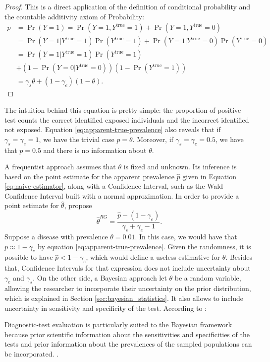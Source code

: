 \begin{proof}
  This is a direct application of the definition of conditional probability
  and the countable additivity axiom of Probability:
  \begin{equation*}
    \begin{split}
      p &= \Pr(Y = 1) = \Pr(Y = 1, Y^{\mathrm{true}} = 1) + \Pr(Y = 1, Y^{\mathrm{true}} = 0) \\
      &= \Pr(Y=1|Y^{\mathrm{true}}=1)\Pr(Y^{\mathrm{true}}=1) + \Pr(Y=1|Y^{\mathrm{true}}=0)\Pr(Y^{\mathrm{true}}=0) \\
      &= \Pr(Y=1|Y^{\mathrm{true}}=1)\Pr(Y^{\mathrm{true}}=1) \\ 
      &+ (1 - \Pr(Y=0|Y^{\mathrm{true}}=0))(1-\Pr(Y^{\mathrm{true}}=1)) \\
      &= \gamma_s\theta + (1 - \gamma_e)(1-\theta).
    \end{split}
  \end{equation*} 
\end{proof}

The intuition behind this equation is pretty simple: the proportion
of positive test counts the correct identified exposed individuals and the
incorrect identified not exposed. Equation \eqref{eq:apparent-true-prevalence}
also reveals that if $\gamma_s = \gamma_e = 1$, we have the trivial 
case $p = \theta$. Moreover, if $\gamma_s = \gamma_e = 0.5$, we have that
$p = 0.5$ and there is no information about $\theta$. 

A frequentist approach assumes that $\theta$ is fixed and unknown. Its
inference is based on the point 
estimate for the apparent prevalence $\hat{p}$ given in Equation
\eqref{eq:naive-estimator}, along with a Confidence Interval, such as the Wald
Confidence Interval built with a normal approximation. In order to provide a 
point estimate for $\hat{\theta}$, \textcite[p. 73]{rogan1978estimating}
propose
\begin{equation}
  \label{eq:rogan-estimate-prevalence}
  \hat{\theta}^{RG} = \frac{\hat{p} - (1-\gamma_e)}{\gamma_s + \gamma_e -
1}.
\end{equation}
Suppose a disease with prevalence $\theta = 0.01$. In this case, we would have
that $p \approx 1 - \gamma_e$ by equation \eqref{eq:apparent-true-prevalence}.
Given the randomness, it is possible to have $\hat{p} < 1 - \gamma_e$, which
would define a useless estimative for $\theta$. Besides that, Confidence Intervals for that 
expression does not include uncertainty about $\gamma_e$ and $\gamma_s$. On
the other side, a Bayesian approach let $\theta$ be a random variable,
allowing the researcher to incorporate their uncertainty on the prior
distribution, which is explained in Section
\ref{sec:bayesian_statistics}. It also allows to include uncertainty in
sensitivity and specificity of the test. According to \textcite{branscum2005estimation}:
\begin{citacao}
  Diagnostic-test evaluation is particularly suited to the
  Bayesian framework because prior scientific information about the
  sensitivities and specificities of the tests and prior information about the prevalences of the sampled
  populations can be incorporated. \cite[p. 1]{branscum2005estimation}.
\end{citacao}

